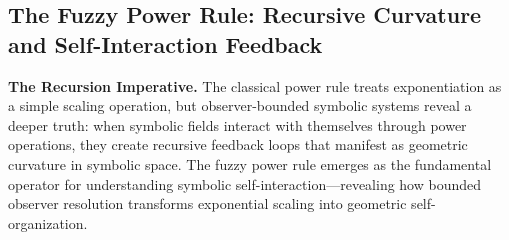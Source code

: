 \subsection{The Fuzzy Power Rule: Recursive Curvature and Self-Interaction Feedback}
\label{subsec:bk4_fuzzy_power_rule}

\textbf{The Recursion Imperative.} The classical power rule treats exponentiation as a simple scaling operation, but observer-bounded symbolic systems reveal a deeper truth: when symbolic fields interact with themselves through power operations, they create recursive feedback loops that manifest as geometric curvature in symbolic space. The fuzzy power rule emerges as the fundamental operator for understanding symbolic self-interaction---revealing how bounded observer resolution transforms exponential scaling into geometric self-organization.

